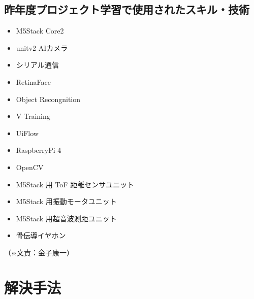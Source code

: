 \documentclass[11pt,a4paper]{report}
\newcommand{\Writer}[1]{
  \normalsize
  \begin{flushright}
    （※文責：#1）
  \end{flushright}
}
\begin{document}
\subsection{昨年度プロジェクト学習で使用されたスキル・技術}
\noindent\space
\begin{itemize}
  \item M5Stack Core2
  \item unitv2 AIカメラ
  \item シリアル通信
  \item RetinaFace
  \item Object Recongnition
  \item V-Training
  \item UiFlow
  \item RaspberryPi 4
  \item OpenCV
  \item M5Stack 用 ToF 距離センサユニット
  \item M5Stack 用振動モータユニット
  \item M5Stack 用超音波測距ユニット
  \item 骨伝導イヤホン
\end{itemize}
\Writer{金子康一}

\newpage

\section{解決手法}
\end{document}
